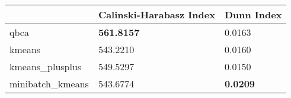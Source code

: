 \begin{table}[htbp]
\centering
\begin{tabular}{lll}
\toprule
 & Calinski-Harabasz Index & Dunn Index \\
\midrule
qbca & \textbf{561.8157} & 0.0163 \\
kmeans & 543.2210 & 0.0160 \\
kmeans_plusplus & 549.5297 & 0.0150 \\
minibatch_kmeans & 543.6774 & \textbf{0.0209} \\
\bottomrule
\end{tabular}
\end{table}
